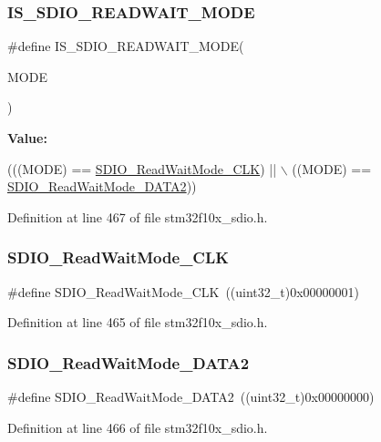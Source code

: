 \subsubsection{\texorpdfstring{I\+S\+\_\+\+S\+D\+I\+O\+\_\+\+R\+E\+A\+D\+W\+A\+I\+T\+\_\+\+M\+O\+DE}{IS\_SDIO\_READWAIT\_MODE}}
{\footnotesize\ttfamily \#define I\+S\+\_\+\+S\+D\+I\+O\+\_\+\+R\+E\+A\+D\+W\+A\+I\+T\+\_\+\+M\+O\+DE(\begin{DoxyParamCaption}\item[{}]{M\+O\+DE }\end{DoxyParamCaption})}

{\bfseries Value\+:}
\begin{DoxyCode}
(((MODE) == \hyperlink{group___s_d_i_o___read___wait___mode_ga5d73b50fed8b2589f337a6301f22f41c}{SDIO\_ReadWaitMode\_CLK}) || \(\backslash\)
                                     ((MODE) == \hyperlink{group___s_d_i_o___read___wait___mode_ga3d6952d82468b49dcc7abd5b9e02039f}{SDIO\_ReadWaitMode\_DATA2}))
\end{DoxyCode}


Definition at line 467 of file stm32f10x\+\_\+sdio.\+h.

\mbox{\label{group___s_d_i_o___read___wait___mode_ga5d73b50fed8b2589f337a6301f22f41c}} 
\subsubsection{\texorpdfstring{S\+D\+I\+O\+\_\+\+Read\+Wait\+Mode\+\_\+\+C\+LK}{SDIO\_ReadWaitMode\_CLK}}
{\footnotesize\ttfamily \#define S\+D\+I\+O\+\_\+\+Read\+Wait\+Mode\+\_\+\+C\+LK~((uint32\+\_\+t)0x00000001)}



Definition at line 465 of file stm32f10x\+\_\+sdio.\+h.

\mbox{\label{group___s_d_i_o___read___wait___mode_ga3d6952d82468b49dcc7abd5b9e02039f}} 
\subsubsection{\texorpdfstring{S\+D\+I\+O\+\_\+\+Read\+Wait\+Mode\+\_\+\+D\+A\+T\+A2}{SDIO\_ReadWaitMode\_DATA2}}
{\footnotesize\ttfamily \#define S\+D\+I\+O\+\_\+\+Read\+Wait\+Mode\+\_\+\+D\+A\+T\+A2~((uint32\+\_\+t)0x00000000)}



Definition at line 466 of file stm32f10x\+\_\+sdio.\+h.

